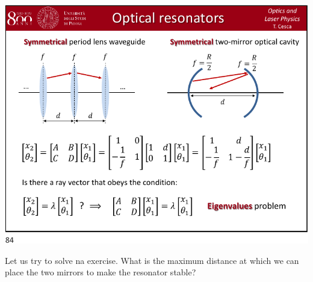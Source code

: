 \documentclass[../main/main.tex]{subfiles}
\begin{document}
\begin{minipage}[]{0.5\linewidth}
\centering
\includegraphics[page=12,width=1\textwidth]{../lessons/pdf_file/21_lecture.pdf}
\end{minipage}
\hspace{0.3cm}\vspace{0.3cm}
\begin{minipage}[c]{0.47\linewidth}

Let us try to solve na exercise. What is the maximum distance at which we can place the two mirrors to make the resonator stable? 

\end{minipage}
\end{document}

